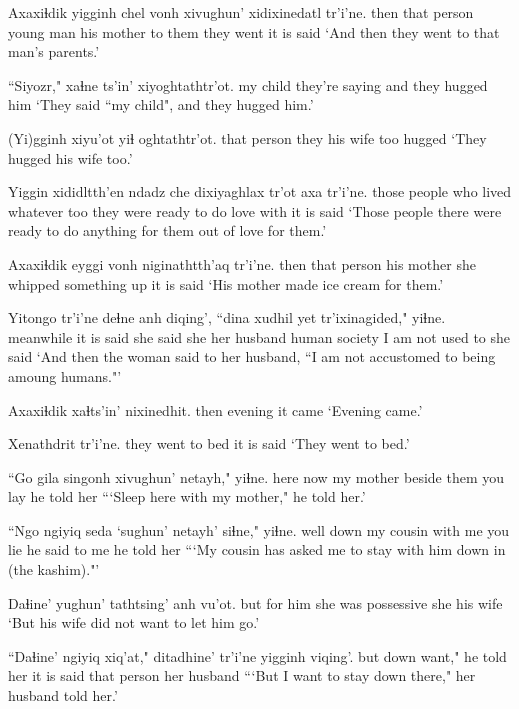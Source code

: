 \documentclass[12pt]{article}
\begin{document}
\gll Axaxiɬdik yigginh chel vonh  xivughun' xidixinedatl tr'i'ne.
then  {that person} {young man} {his mother} {to them}  {they went} {it is said}
\glt `And then they went to that man's parents.'
\glend

\gll ``Siyozr," xaɬne ts'in' xiyoghtathtr'ot.
{my child} {they're saying} and {they hugged him}
\glt `They said ``my child", and they hugged him.'
\glend

\gll (Yi)gginh xiyu'ot yiɬ oghtathtr'ot.
{that person} {they his wife} too  hugged
\glt `They hugged his wife too.'
\glend

\gll Yiggin  xididltth'en ndadz che dixiyaghlax  tr'ot axa tr'i'ne.
{those people} {who lived} whatever too {they were ready to do} love with {it is said}
\glt `Those people there were ready to do anything for them out of love for them.'
\glend

\gll Axaxiɬdik eyggi vonh  niginathtth'aq tr'i'ne.
then  {that person}  {his mother} {she whipped something up} {it is said}
\glt `His mother made ice cream for them.'
\glend

\gll Yitongo tr'i'ne deɬne anh diqing', ``dina  {xudhil yet} tr'ixinagided," yiɬne.
meanwhile {it is said} {she said} she {her husband} human society  {I am not used to} {she said}
\glt `And then the woman said to her husband, ``I am not accustomed to being amoung humans."'
\glend

\gll Axaxiɬdik xaɬts'in' nixinedhit.
then  evening {it came}
\glt `Evening came.'
\glend

\gll Xenathdrit  tr'i'ne.
{they went to bed} {it is said}
\glt `They went to bed.'
\glend

\gll ``Go gila singonh xivughun' netayh," yiɬne.
here now {my mother} {beside them} {you lay} {he told her}
\glt ```Sleep here with my mother," he told her.'
\glend

\gll ``Ngo ngiyiq  seda `sughun' netayh' siɬne,"  yiɬne.
well {down} {my cousin} {with me} {you lie} {he said to me} {he told her}
\glt ```My cousin has asked me to stay with him down in (the kashim)."'
\glend

\gll Daɬine' yughun' tathtsing'  anh vu'ot.
but  {for him} {she was possessive} she {his wife}
\glt `But his wife did not want to let him go.'
\glend

\gll ``Daɬine' ngiyiq xiq'at," ditadhine' tr'i'ne yigginh viqing'.
but  down want," {he told her} {it is said} {that person} {her husband}
\glt ```But I want to stay down there," her husband told her.'
\glend
\end{document}
